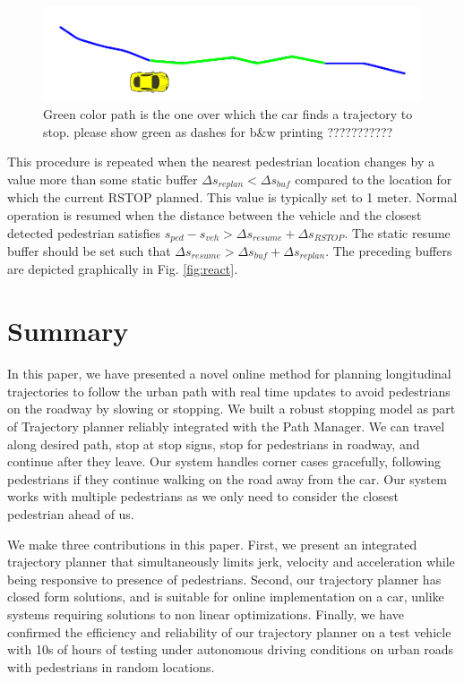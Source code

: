 \documentclass[letterpaper, 10 pt, conference]{ieeeconf}  %
\begin{document}
\begin{figure}[thpb]
  \centering
  \includegraphics[width=1.0\columnwidth]{graphics/RSTOP_path_truncation.png}
  \caption{Green color path is the one over which the car finds a trajectory to stop. please show green as dashes for b\&w printing ??????????? }
  \label{fig:pathtostop}
\end{figure}

This procedure is repeated when the nearest pedestrian location changes by a value more than some static buffer $\Delta s_{replan} < \Delta s_{buf}$ compared to the location for which the current RSTOP planned.
This value is typically set to 1 meter.
Normal operation is resumed when the distance between the vehicle and the closest detected pedestrian satisfies $s_{ped} - s_{veh} > \Delta s_{resume} + \Delta s_{RSTOP}$. The static resume buffer should be set such that $\Delta s_{resume} > \Delta s_{buf} + \Delta s_{replan}$.
The preceding buffers are depicted graphically in Fig. \ref{fig:react}.

\section{Summary} \label{sec:summary}

In this paper, we have presented a novel online method for planning longitudinal trajectories 
to follow the urban path with real time updates to avoid pedestrians on the roadway by slowing or 
stopping. We built a robust stopping model as part of Trajectory planner reliably integrated with 
the Path Manager.
We can travel along desired path, stop at stop signs, stop for pedestrians in roadway, and continue after 
they leave. Our system handles corner cases gracefully, following pedestrians if they continue walking 
on the road away from the car. Our system works with multiple pedestrians as we only 
need to consider the closest pedestrian ahead of us. 

We make three contributions in this paper. First, we present an integrated trajectory planner that
simultaneously limits jerk, velocity and acceleration while being responsive to presence of pedestrians.
Second, our trajectory planner has closed form solutions, and is suitable for online implementation
on a car, unlike systems requiring solutions to non linear optimizations. Finally, we have confirmed the
efficiency and reliability of our trajectory planner on a test vehicle with 10s of hours of testing
under autonomous driving conditions on urban roads with pedestrians in random locations. 
\end{document}
